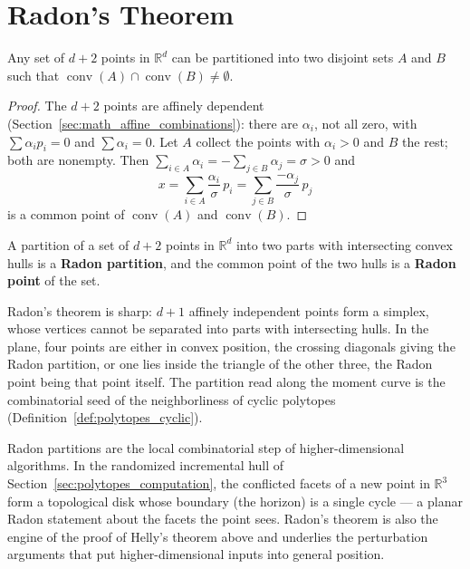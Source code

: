 
\section{Radon's Theorem}
\label{sec:polytopes_radon}

\begin{theorem}[Radon]\label{thm:polytopes_radon}
  Any set of $d + 2$ points in $\mathbb{R}^d$ can be partitioned into two
  disjoint sets $A$ and $B$ such that
  $\operatorname{conv}(A) \cap \operatorname{conv}(B) \neq \emptyset$.
\end{theorem}

\begin{proof}
  The $d + 2$ points are affinely dependent
  (Section~\ref{sec:math_affine_combinations}): there are $\alpha_i$, not
  all zero, with $\sum \alpha_i p_i = 0$ and $\sum \alpha_i = 0$. Let $A$
  collect the points with $\alpha_i > 0$ and $B$ the rest; both are
  nonempty. Then $\sum_{i \in A} \alpha_i = -\sum_{j \in B} \alpha_j =
  \sigma > 0$ and
  \[
    x = \sum_{i \in A} \frac{\alpha_i}{\sigma} \, p_i
      = \sum_{j \in B} \frac{-\alpha_j}{\sigma} \, p_j
  \]
  is a common point of $\operatorname{conv}(A)$ and $\operatorname{conv}(B)$.
\end{proof}

\begin{definition}\label{def:polytopes_radon_partition}
  A partition of a set of $d + 2$ points in $\mathbb{R}^d$ into two parts
  with intersecting convex hulls is a \textbf{Radon partition}, and the
  common point of the two hulls is a \textbf{Radon point} of the set.
\end{definition}

Radon's theorem is sharp: $d+1$ affinely independent points form a simplex,
whose vertices cannot be separated into parts with intersecting hulls. In
the plane, four points are either in convex position, the crossing diagonals
giving the Radon partition, or one lies inside the triangle of the other
three, the Radon point being that point itself. The partition read along
the moment curve is the combinatorial seed of the neighborliness of cyclic
polytopes (Definition~\ref{def:polytopes_cyclic}).

Radon partitions are the local combinatorial step of higher-dimensional
algorithms. In the randomized incremental hull of
Section~\ref{sec:polytopes_computation}, the conflicted facets of a new
point in $\mathbb{R}^3$ form a topological disk whose boundary (the horizon)
is a single cycle --- a planar Radon statement about the facets the point
sees. Radon's theorem is also the engine of the proof of Helly's theorem
above and underlies the perturbation arguments that put higher-dimensional
inputs into general position.

